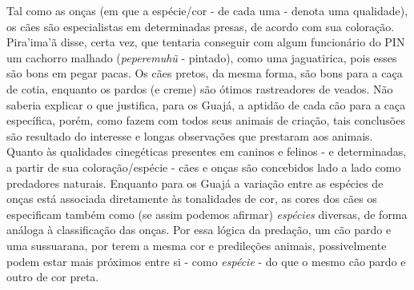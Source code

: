 Tal como as onças (em que a espécie/cor - de cada uma - denota uma
qualidade), os cães são especialistas em determinadas presas, de acordo
com sua coloração. Pira'ima'ã disse, certa vez, que tentaria conseguir
com algum funcionário do PIN um cachorro malhado (\emph{peperemuhũ} -
pintado), como uma jaguatirica, pois esses são bons em pegar pacas. Os
cães pretos, da mesma forma, são bons para a caça de cotia, enquanto os
pardos (e creme) são ótimos rastreadores de veados. Não saberia explicar
o que justifica, para os Guajá, a aptidão de cada cão para a caça
específica, porém, como fazem com todos seus animais de criação, tais
conclusões são resultado do interesse e longas observações que prestaram
aos animais. Quanto às qualidades cinegéticas presentes em caninos e
felinos - e determinadas, a partir de sua coloração/espécie - cães e
onças são concebidos lado a lado como predadores naturais. Enquanto para
os Guajá a variação entre as espécies de onças está associada
diretamente às tonalidades de cor, as cores dos cães os especificam
também como (se assim podemos afirmar) \emph{espécies} diversas, de
forma análoga à classificação das onças. Por essa lógica da predação, um
cão pardo e uma sussuarana, por terem a mesma cor e predileções animais,
possivelmente podem estar mais próximos entre si - como \emph{espécie} -
do que o mesmo cão pardo e outro de cor preta.

